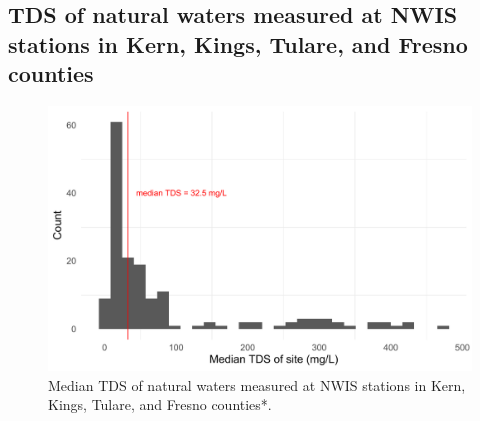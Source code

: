 \egroup
\clearpage


\subsection{TDS of natural waters measured at NWIS stations in Kern, Kings, Tulare, and Fresno counties}


\bgroup

\begin{figure}[H]
	\includegraphics[width=\textwidth]{ch3_appendix_figs/natural_waters.pdf}
	\caption{Median TDS of natural waters measured at NWIS stations in Kern, Kings, Tulare, and Fresno counties*.}
	\label{ap_b_nat_waters}
\end{figure}

\egroup

